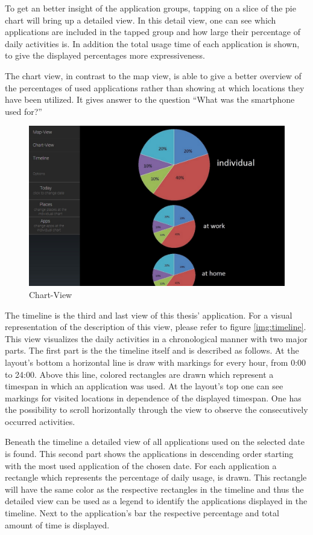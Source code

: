 To  get an better insight of the application groups, tapping on a slice of the pie chart will bring up a detailed view. In this detail view, one can see which applications are included in the tapped group and how large their percentage of daily activities is. In addition the total usage time of each application is shown, to give the displayed percentages more expressiveness.

The chart view, in contrast to the map view, is able to give a better overview of the percentages of used applications rather than showing at which locations they have been utilized. It gives answer to the question ``What was the smartphone used for?''
\begin{figure}[h]
	\caption{Chart-View}
	\label{img:chartview}
	\includegraphics[width=\textwidth]{images/Design/2_ChartView.jpg}
\end{figure}

The  timeline is the third and last view of this thesis' application. For a visual representation of the description of this view, please refer to figure \ref{img:timeline}. This view visualizes the daily activities in a chronological manner with two major parts. The first part is the the timeline itself and is described as follows. At the layout's bottom a horizontal line is draw with markings for every hour, from 0:00 to 24:00. Above this line, colored rectangles are drawn which represent a timespan in which an application was used. At the layout's top one can see markings for visited locations in dependence of the displayed timespan. One has the possibility to scroll horizontally through the view to observe the consecutively occurred activities.

Beneath  the timeline a detailed view of all applications used on the selected date is found. This second part shows the applications in descending order starting with the most used application of the chosen date. For each application a rectangle which represents the percentage of daily usage, is drawn. This rectangle will have the same color as the respective rectangles in the timeline and thus the detailed view can be used as a legend to identify the applications displayed in the timeline. Next to the application's bar the respective percentage and total amount of time is displayed.

